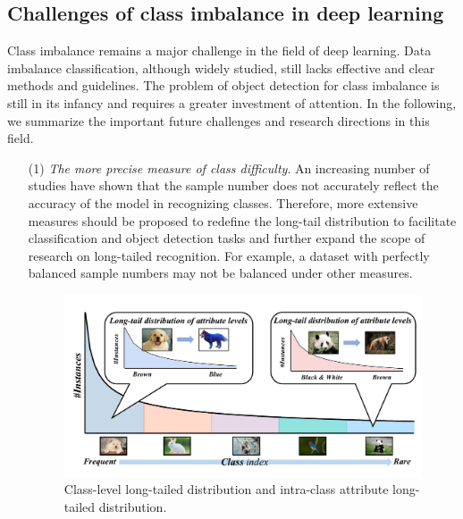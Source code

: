 \documentclass[10pt]{article} %
\begin{document}
\subsection{Challenges of class imbalance in deep learning\label{J.4}}

Class imbalance remains a major challenge in the field of deep learning. Data imbalance classification, although widely studied, still lacks effective and clear methods and guidelines. The problem of object detection for class imbalance is still in its infancy and requires a greater investment of attention. In the following, we summarize the important future challenges and research directions in this field.

\begin{itemize}
     \item[(1)] \emph{The more precise measure of class difficulty}. An increasing number of studies have shown that the sample number does not accurately reflect the accuracy of the model in recognizing classes. Therefore, more extensive measures should be proposed to redefine the long-tail distribution to facilitate classification and object detection tasks and further expand the scope of research on long-tailed recognition. For example, a dataset with perfectly balanced sample numbers may not be balanced under other measures.

\begin{figure}[h]%
\begin{center}
\vskip -0.14in
\includegraphics[width=0.95\columnwidth]{nfig35}
\vskip -0.2in
\caption{Class-level long-tailed distribution and intra-class attribute long-tailed distribution.}
\label{fig26}
\end{center}
\vskip -0.15in
\end{figure}


\end{itemize}
\end{document}
